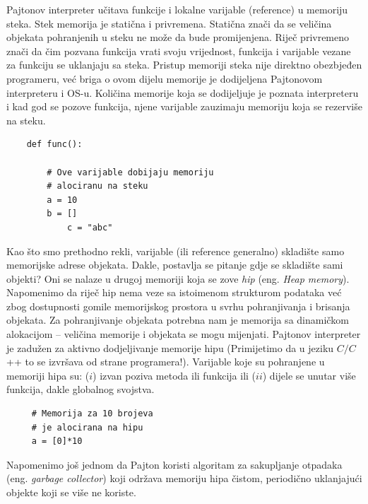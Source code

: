 Pajtonov interpreter učitava funkcije i lokalne varijable (reference) u memoriju steka. 
Stek memorija je statična i privremena. Statična znači da se veličina objekata pohranjenih u steku ne može da bude promijenjena. Riječ privremeno znači da čim pozvana funkcija vrati svoju vrijednost, funkcija i   varijable vezane za funkciju se uklanjaju sa steka. Pristup memoriji steka nije direktno obezbjeđen programeru, već  briga o ovom dijelu memorije je dodijeljena Pajtonovom interpreteru i OS-u.  Količina memorije koja  se dodijeljuje je poznata interpreteru i kad god se pozove funkcija, njene varijable zauzimaju memoriju koja se rezerviše na steku.

\begin{verbatim}
	def func():
	
	    # Ove varijable dobijaju memoriju 
	    # alociranu na steku 
	    a = 10
	    b = []
            c = "abc"
\end{verbatim}

Kao što smo prethodno rekli, varijable (ili reference generalno) skladište samo memorijske adrese objekata. Dakle, postavlja se pitanje gdje se skladište sami objekti? Oni se nalaze u drugoj memoriji koja se zove \textit{hip} (eng. \textit{Heap memory}). Napomenimo da riječ hip nema veze sa istoimenom strukturom podataka  već  zbog dostupnosti gomile memorijskog prostora u svrhu pohranjivanja i brisanja objekata.   Za pohranjivanje objekata potrebna nam je memorija sa dinamičkom alokacijom  -- veličina memorije i objekata se mogu mijenjati. Pajtonov interpreter je zadužen za aktivno dodjeljivanje memorije hipu (Primijetimo da u jeziku $C/C$++ to  se izvršava od strane programera!). Varijable koje su pohranjene u memoriji hipa su: ($i$)   izvan poziva metoda ili funkcija ili ($ii$) dijele se unutar više funkcija, dakle globalnog svojstva.

\begin{verbatim}
     # Memorija za 10 brojeva
     # je alocirana na hipu
     a = [0]*10     
\end{verbatim}


Napomenimo još jednom da Pajton koristi algoritam za sakupljanje otpadaka (eng. \textit{garbage collector}) koji održava memoriju hipa čistom, periodično uklanjajući  objekte koji se više ne koriste.



